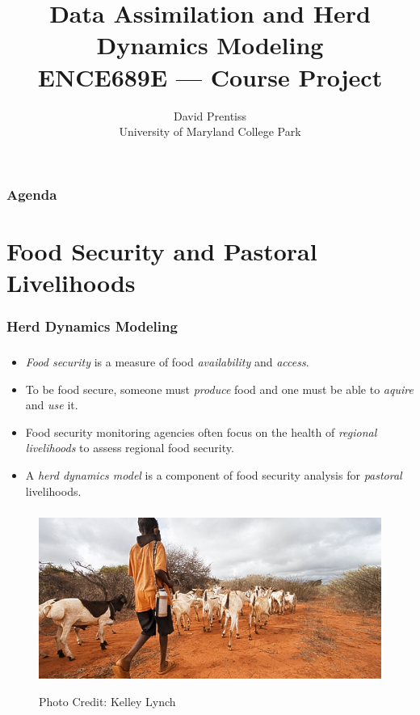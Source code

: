 \documentclass[mathserif]{beamer}
\begin{document}
\nobibliography*
\title{Data Assimilation and Herd Dynamics Modeling \\ ENCE689E --- Course Project}
\author{David Prentiss \\ University of Maryland College Park}

\frame{\titlepage}

\begin{frame}
  \frametitle{Agenda}
  \tableofcontents
\end{frame}

\section{Food Security and Pastoral Livelihoods}

\begin{frame}
\frametitle{Herd Dynamics Modeling}
\tableofcontents[currentsection]
\end{frame}

\begin{frame}
\frametitle{\insertsection}
\begin{itemize}
\item \emph{Food security} is a measure of food \emph{availability} and \emph{access}.
\item To be food secure, someone must \emph{produce} food and one must be able to \emph{aquire} and \emph{use} it.
\item Food security monitoring agencies often focus on the health of \emph{regional livelihoods} to assess regional food security.
\item A \emph{herd dynamics model} is a component of food security analysis for \emph{pastoral} livelihoods.
\end{itemize}
\end{frame}

\begin{frame}
\begin{figure}
\begin{center}
\frametitle{\insertsection}
\includegraphics[width=1\textwidth]{image}

Photo Credit: Kelley Lynch
\end{center}
\end{figure}
\end{frame}
\end{document}
